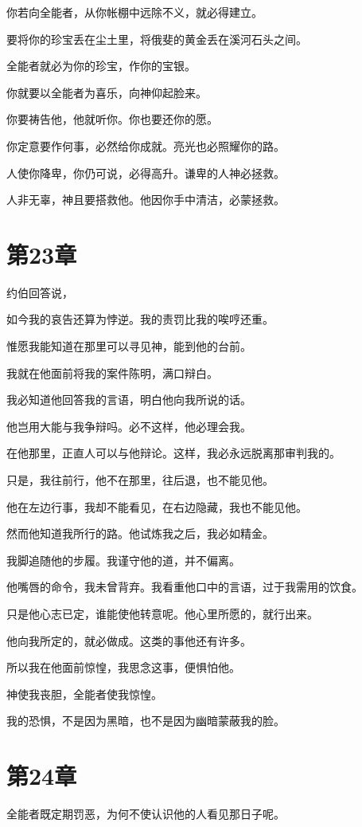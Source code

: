 \documentclass[12pt,oneside]{book}
\begin{document}
你若向全能者，从你帐棚中远除不义，就必得建立。

要将你的珍宝丢在尘土里，将俄斐的黄金丢在溪河石头之间。

全能者就必为你的珍宝，作你的宝银。

你就要以全能者为喜乐，向神仰起脸来。

你要祷告他，他就听你。你也要还你的愿。

你定意要作何事，必然给你成就。亮光也必照耀你的路。

人使你降卑，你仍可说，必得高升。谦卑的人神必拯救。

人非无辜，神且要搭救他。他因你手中清洁，必蒙拯救。


\chapter{第23章}
约伯回答说，

如今我的哀告还算为悖逆。我的责罚比我的唉哼还重。

惟愿我能知道在那里可以寻见神，能到他的台前。

我就在他面前将我的案件陈明，满口辩白。

我必知道他回答我的言语，明白他向我所说的话。

他岂用大能与我争辩吗。必不这样，他必理会我。

在他那里，正直人可以与他辩论。这样，我必永远脱离那审判我的。

只是，我往前行，他不在那里，往后退，也不能见他。

他在左边行事，我却不能看见，在右边隐藏，我也不能见他。

然而他知道我所行的路。他试炼我之后，我必如精金。

我脚追随他的步履。我谨守他的道，并不偏离。

他嘴唇的命令，我未曾背弃。我看重他口中的言语，过于我需用的饮食。

只是他心志已定，谁能使他转意呢。他心里所愿的，就行出来。

他向我所定的，就必做成。这类的事他还有许多。

所以我在他面前惊惶，我思念这事，便惧怕他。

神使我丧胆，全能者使我惊惶。

我的恐惧，不是因为黑暗，也不是因为幽暗蒙蔽我的脸。


\chapter{第24章}
全能者既定期罚恶，为何不使认识他的人看见那日子呢。
\end{document}
